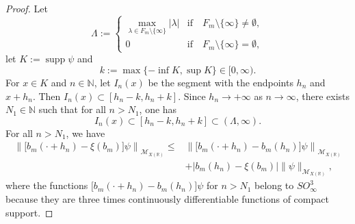 \documentclass{birkjour}
\numberwithin{equation}{section}
\newcommand{\N}{\mathbb{N}}
\newcommand{\R}{\mathbb{R}}
\newcommand{\cM}{\mathcal{M}}
\begin{document}
\begin{proof}
Let
\[
\Lambda:=\begin{cases}
\max\limits_{\lambda\in F_m\setminus\{\infty\}}|\lambda|
&\mbox{if}\quad F_m\setminus\{\infty\}\ne\emptyset,
\\
0 &\mbox{if}\quad F_m\setminus\{\infty\}=\emptyset,
\end{cases}
\]
let $K:=\operatorname{supp}\psi$ and
\[
k:=\max\{-\inf K,\sup K\}\in[0,\infty).
\]
For $x\in K$ and $n\in\N$, let $I_n(x)$ be the segment with the endpoints $h_n$
and $x+h_n$. Then $I_n(x)\subset [h_n-k,h_n+k]$.
Since $h_n\to+\infty$ as $n\to\infty$, there exists $N_1\in\N$ such that for
all $n>N_1$, one has
\[
I_n(x)\subset[h_n-k,h_n+k]\subset(\Lambda,\infty).
\]
For all $n>N_1$, we have
\begin{align}
\left\|
\big[b_m(\cdot+h_n)-\xi(b_m)\big]\psi
\right\|_{\cM_{X(\R)}}
\le&
\left\|\big[b_m(\cdot+h_n)-b_m(h_n)\big]\psi
\right\|_{\cM_{X(\R)}}
\nonumber\\
&+
\big|b_m(h_n)-\xi(b_m)\big|\|\psi\|_{\cM_{X(\R)}},
\label{eq:LO-convolution-SO-9}
\end{align}
where the functions
$\big[b_m(\cdot+h_n)-b_m(h_n)\big]\psi$ for $n>N_1$
belong to $SO_\infty^3$ because they are three times continuously
differentiable functions of compact support.


\end{proof}
\end{document}
